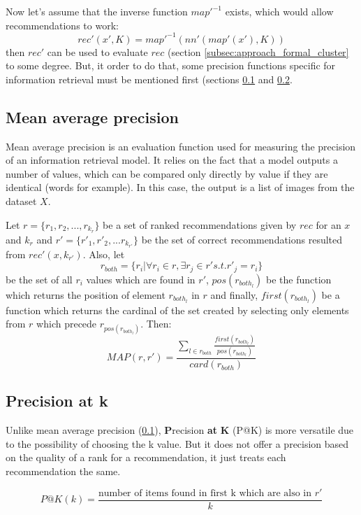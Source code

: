 Now let's assume that the inverse function $map'^{-1}$ exists, which would allow recommendations to work:
$$ rec'(x', K) = map'^{-1}(nn'(map'(x'), K)) $$
then $rec'$ can be used to evaluate $rec$ (section \ref{subsec:approach_formal_cluster} to some degree. But, it order to do that, some precision functions specific for information retrieval must be mentioned first (sections \ref{subsec:results_eval_map} and \ref{subsec:results_eval_patk}.

\subsection{Mean average precision}
\label{subsec:results_eval_map}

Mean average precision is an evaluation function used for measuring the precision of an information retrieval model. It relies on the fact that a model outputs a number of values, which can be compared only directly by value if they are identical (words for example). In this case, the output is a list of images from the dataset $X$. 

Let $r = \{r_1, r_2, ..., r_{k_r}\} $ be a set of ranked recommendations given by $rec$ for an $x$ and $k_r$ and $r' = \{r'_1, r'_2, ... r_{k_{r'}}\} $ be the set of correct recommendations resulted from $rec'(x, k_{r'})$. Also, let 
$$ r_{both} = \{ r_i | \forall r_i \in r, \exists r_j \in r' s.t. r'_j = r_i \} $$ 
be the set of all $r_i$ values which are found in $r'$, $pos(r_{both_l})$ be the function which returns the position of element $r_{both_l}$ in $r$ and finally, $first(r_{both_l})$ be a function which returns the cardinal of the set created by selecting only elements from $r$ which precede $r_{pos(r_{both_l})}$. Then:
$$ MAP(r, r') = \frac{\sum_{l \in r_{both}}{\frac{first(r_{both_l})}{pos(r_{both_l})}}}{card(r_{both})} $$

\subsection{Precision at k}
\label{subsec:results_eval_patk}

Unlike mean average precision (\ref{subsec:results_eval_map}), \textbf{P}recision \textbf{at} \textbf{K} (P@K) is more versatile due to the possibility of choosing the k value. But it does not offer a precision based on the quality of a rank for a recommendation, it just treats each recommendation the same.

$$P@K(k) = \frac{\textrm{number of items found in first k which are also in } r'}{k} $$

